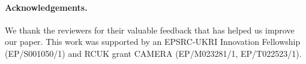 \paragraph{Acknowledgements.}

We thank the reviewers for their valuable feedback that has helped us improve our paper.
This work was supported by an EPSRC-UKRI Innovation Fellowship (EP/S001050/1) and RCUK grant CAMERA (EP/M023281/1, EP/T022523/1).
